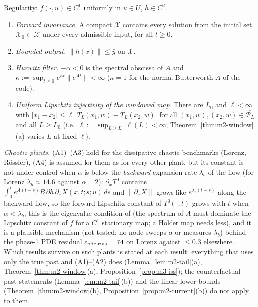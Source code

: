 \begin{assumption}\label{ass:m1}
Regularity: $f(\cdot,u)\in C^1$ uniformly in $u\in U$, $h\in C^2$.
\begin{enumerate}
\item[(A1)] \emph{Forward invariance.} A compact $\mathcal X$ contains every solution from the initial set
  $\mathcal X_0\subset\mathcal X$ under every admissible input, for all $t\ge0$.
\item[(A2)] \emph{Bounded output.} $\|h(x)\|\le\bar y$ on $\mathcal X$.
\item[(A3)] \emph{Hurwitz filter.} $-\alpha<0$ is the spectral abscissa of $A$ and
  $\kappa:=\sup_{t\ge0}e^{\alpha t}\|e^{At}\|<\infty$ ($\kappa=1$ for the normal Butterworth $A$ of the code).
\item[(A4)] \emph{Uniform Lipschitz injectivity of the windowed map.} There are $L_0$ and $\ell<\infty$ with
  $|x_1-x_2|\le\ell\,|T_L(x_1,w)-T_L(x_2,w)|$ for all $(x_1,w),(x_2,w)\in\overline{\mathcal P_L}$ and all
  $L\ge L_0$ (i.e.\ $\ell:=\sup_{L\ge L_0}\ell(L)<\infty$; Theorem~\ref{thm:m2-window}(a) varies $L$ at fixed $\ell$).
\end{enumerate}
\end{assumption}
\noindent\emph{Chaotic plants.} (A1)--(A3) hold for the dissipative chaotic benchmarks (Lorenz, R\"ossler), (A4) is
assumed for them as for every other plant, but its constant is not under control when $\alpha$ is below the
\emph{backward} expansion rate $\lambda_b$ of the flow (for Lorenz $\lambda_b\approx14.6$ against $\alpha=2$):
$\partial_xT^0$ contains $\int_0^te^{A(t-s)}B\,\partial h\,\partial_xX(x,t;s;u)\,ds$ and $\|\partial_xX\|$ grows like
$e^{\lambda_b(t-s)}$ along the backward flow, so the forward Lipschitz constant of $T^0(\cdot,t)$ grows with $t$ when
$\alpha<\lambda_b$; this is the eigenvalue condition of \citet{andrieu2006existence} (the spectrum of $A$ must
dominate the Lipschitz constant of $f$ for a $C^1$ stationary map; a H\"older map needs less), and it is a plausible
mechanism (not tested: no node sweeps $\alpha$ or measures $\lambda_b$) behind the phase-1 PDE residual
$\varepsilon_{\rm pde,rms}=74$ on Lorenz against $\le0.3$ elsewhere. Which results survive on such plants is stated at
each result: everything that uses only the true past and (A1)--(A2) does (Lemma~\ref{lem:m2-tail}(a),
Theorem~\ref{thm:m2-window}(a), Proposition~\ref{prop:m3-iss}); the counterfactual-past statements
(Lemma~\ref{lem:m2-tail}(b)) and the linear lower bounds (Theorem~\ref{thm:m2-window}(b),
Proposition~\ref{prop:m2-current}(b)) do not apply to them.

